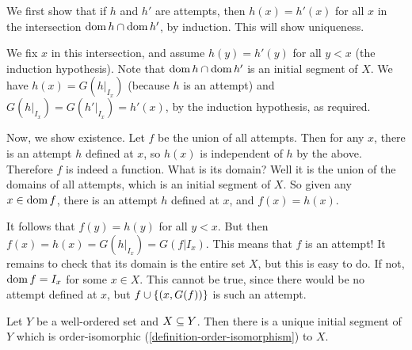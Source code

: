\documentclass{article}
\begin{document}
\begin{prf}
    We first show that if $h$ and $h'$ are attempts, then $h(x) = h'(x)$ for all $x$ in the intersection $\operatorname{dom} h \cap \operatorname{dom} h'$, by induction. This will show uniqueness.
    
    We fix $x$ in this intersection, and assume $h(y) = h'(y)$ for all $y < x$ (the induction hypothesis). Note that $\operatorname{dom} h \cap \operatorname{dom} h'$ is an initial segment of $X$. We have $h(x) = G(h|_{I_x})$ (because $h$ is an attempt) and $G(h|_{I_x}) = G(h'|_{I_x}) = h'(x)$, by the induction hypothesis, as required.
    
    Now, we show existence. Let $f$ be the union of all attempts. Then for any $x$, there is an attempt $h$ defined at $x$, so $h(x)$ is independent of $h$ by the above. Therefore $f$ is indeed a function. What is its domain? Well it is the union of the domains of all attempts, which is an initial segment of $X$. So given any $x \in \operatorname{dom} f$, there is an attempt $h$ defined at $x$, and $f(x) = h(x)$.
    
    It follows that $f(y) = h(y)$ for all $y < x$. But then $f(x) = h(x) = G(h|_{I_x}) = G(f|{I_x})$. This means that $f$ is an attempt! It remains to check that its domain is the entire set $X$, but this is easy to do. If not, $\operatorname{dom} f = I_x$ for some $x \in X$. This cannot be true, since there would be no attempt defined at $x$, but $f \cup \left\lbrace (x, G(f)) \right\rbrace$ is such an attempt.
\end{prf}

\begin{proposition}
	\label{subset-collapse-result}
    Let $Y$ be a well-ordered set and $X \subseteq Y$. Then there is a unique initial segment of $Y$ which is order-isomorphic (\ref{definition-order-isomorphism}) to $X$.
\end{proposition}
\end{document}
